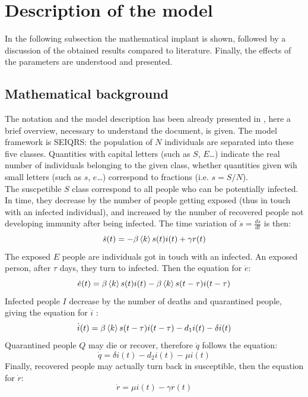 
\section{Description of the model}
\label{sec:model}

In the following subsection the mathematical implant is shown, followed by a discussion of the obtained results compared to literature. Finally, the effects of the parameters are understood and presented.

\subsection{Mathematical background}
\label{ssec:math}
The notation and the model description has been already presented in \cite{MingLiu}, here a brief overview, necessary to understand the document, is given. The model framework is SEIQRS: the population of $N$ individuals are separated into these five classes. Quantities with capital letters (such as $S$, $E$\dots) indicate the real number of individuals belonging to the given class, whether quantities given wih small letters (such as $s$, $e$\dots) correspond to fractions (i.e. $s = S/N$). \\

The suscpetible $S$ class correspond to all people who can be potentially infected. In time, they decrease by the number of people getting exposed (thus in touch with an infected individual), and increased by the number of recovered people not developing immunity after being infected. The time variation of $\dot{s} = \frac{ds}{dt}$ is then:
\begin{equation}
\dot{s} (t)= -\beta\braket{k}s(t)i(t)+\gamma{r(t)} 
\end{equation} 
The exposed $E$ people are individuals got in touch with an infected. An exposed person, after $\tau$ days, they turn to infected. Then the equation for $\dot{e}$:
\begin{equation}
\dot{e} (t)= \beta\braket{k}s(t)i(t) - \beta\braket{k}s(t-\tau)i(t-\tau) 
\end{equation} 
Infected people $I$ decrease by the number of deaths and quarantined people, giving the equation for $\dot{i}$ :
\begin{equation}
\dot{i} (t)= \beta\braket{k}s(t-\tau)i(t-\tau) - d_1i(t) - \delta {i(t)}
\label{eqn:idot}
\end{equation} 
Quarantined people $Q$ may die or recover, therefore $\dot{q}$ follows the equation:
\begin{equation}
\dot{q} = \delta{i(t)} - d_2{i(t)} - \mu{i(t)}
\end{equation}
Finally, recovered people may actually turn back in susceptible, then the equation for $\dot{r}$:
\begin{equation}
\dot{r} = \mu{i(t)}-\gamma{r(t)}
\end{equation}

